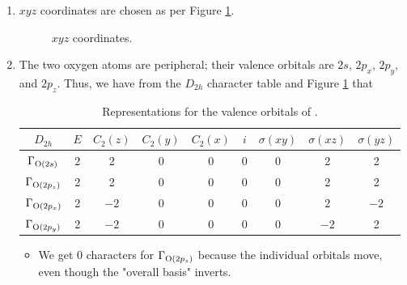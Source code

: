 \documentclass[../notes.tex]{subfiles}
\begin{document}
\begin{itemize}
\begin{enumerate}
\begin{table}[h!]
            \caption{$D_{2h}$ character table.}
            \label{tab:charTableD2h}
        \end{table}
        \item $xyz$ coordinates are chosen as per Figure \ref{fig:xyzCO2}.
        \begin{figure}[h!]
            \centering
            \footnotesize
            \caption{ $xyz$ coordinates.}
            \label{fig:xyzCO2}
        \end{figure}
        \item The two oxygen atoms are peripheral; their valence orbitals are $2s$, $2p_x$, $2p_y$, and $2p_z$. Thus, we have from the $D_{2h}$ character table and Figure \ref{fig:xyzCO2} that
        \begin{table}[h!]
            \centering
            \small
            \renewcommand{\arraystretch}{1.2}
            \begin{tabular}{c|cccccccc}
                $D_{2h}$ & $E$ & $C_2(z)$ & $C_2(y)$ & $C_2(x)$ & $i$ & $\sigma(xy)$ & $\sigma(xz)$ & $\sigma(yz)$\\
                \hline
                $\Gamma_{\ce{O}(2s)}$ & 2 & 2 & 0 & 0 & 0 & 0 & 2 & 2\\
                $\Gamma_{\ce{O}(2p_z)}$ & 2 & 2 & 0 & 0 & 0 & 0 & 2 & 2\\
                $\Gamma_{\ce{O}(2p_x)}$ & 2 & $-2$ & 0 & 0 & 0 & 0 & 2 & $-2$\\
                $\Gamma_{\ce{O}(2p_y)}$ & 2 & $-2$ & 0 & 0 & 0 & 0 & $-2$ & 2\\
            \end{tabular}
            \caption{Representations for the valence orbitals of .}
            \label{tab:CO2RR}
        \end{table}
        \begin{itemize}
            \item We get 0 characters for $\Gamma_{\ce{O}(2p_z)}$ because the individual orbitals move, even though the "overall basis" inverts.

\end{itemize}
\end{enumerate}
\end{itemize}
\end{document}
